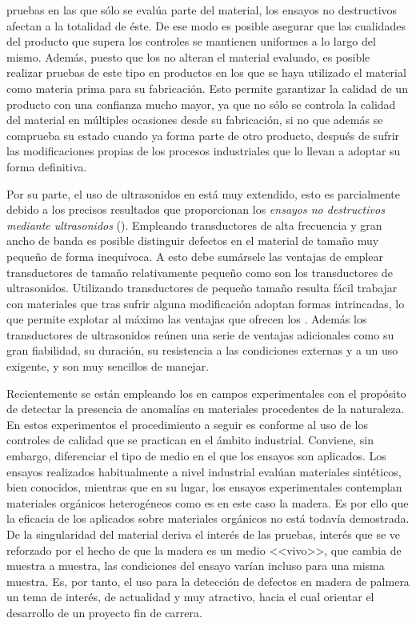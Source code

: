 pruebas en las que sólo se evalúa parte del material, los ensayos no
destructivos afectan a la totalidad de éste. De ese modo es posible
asegurar que las cualidades del producto que supera los controles se
mantienen uniformes a lo largo del mismo. Además, puesto que los 
no alteran el material evaluado, es posible realizar pruebas de este tipo
en productos en los que se haya utilizado el material como materia prima
para su fabricación. Esto permite garantizar la calidad de un producto con
una confianza mucho mayor, ya que no sólo se controla la calidad del
material en múltiples ocasiones desde su fabricación, si no que además se
comprueba su estado cuando ya forma parte de otro producto, después de
sufrir las modificaciones propias de los procesos industriales que lo
llevan a adoptar su forma definitiva.

Por su parte, el uso de ultrasonidos en  está muy extendido, esto
es parcialmente debido a los precisos resultados que proporcionan los
\emph{ensayos no destructivos mediante ultrasonidos} ().
Empleando transductores de alta frecuencia y gran ancho de banda es posible
distinguir defectos en el material de tamaño muy pequeño de forma
inequívoca. A esto debe sumársele las ventajas de emplear transductores de
tamaño relativamente pequeño como son los transductores de ultrasonidos.
Utilizando transductores de pequeño tamaño resulta fácil trabajar con
materiales que tras sufrir alguna modificación adoptan formas intrincadas,
lo que permite explotar al máximo las ventajas que ofrecen los .
Además los transductores de ultrasonidos reúnen una serie de ventajas
adicionales como su gran fiabilidad, su duración, su resistencia a las
condiciones externas y a un uso exigente, y son muy sencillos de
manejar.

Recientemente se están empleando los  en campos experimentales
con el propósito de detectar la presencia de anomalías en materiales
procedentes de la naturaleza. En estos experimentos el procedimiento a
seguir es conforme al uso de los controles de calidad que se practican en
el ámbito industrial. Conviene, sin embargo, diferenciar el tipo de medio
en el que los ensayos son aplicados. Los ensayos realizados habitualmente a
nivel industrial evalúan materiales sintéticos, bien conocidos, mientras
que en su lugar, los ensayos experimentales contemplan materiales orgánicos
heterogéneos como es en este caso la madera. Es por ello que la eficacia de
los  aplicados sobre materiales orgánicos no está todavía
demostrada. De la singularidad del material deriva el interés de las
pruebas, interés que se ve reforzado por el hecho de que la madera es un
medio <<vivo>>, que cambia de muestra a muestra, las condiciones del ensayo
varían incluso para una misma muestra. Es, por tanto, el uso 
para la detección de defectos en madera de palmera un tema de interés, de
actualidad y muy atractivo, hacia el cual orientar el desarrollo de un
proyecto fin de carrera.


